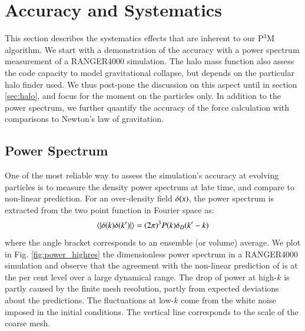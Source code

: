 \section{Accuracy and Systematics}
\label{sec:accuracy}
 
 This section describes the systematics effects that are inherent to our P$^{3}$M algorithm.
 We start with a demonstration of the accuracy with a power spectrum measurement of a RANGER4000 simulation. 
 The halo mass function also assess the code capacity to model gravitational collapse, 
 but depends on the particular halo finder used.
 We thus post-pone the discussion on this aspect until in section \ref{sec:halo},
and focus for the moment on the particles only. In addition to the power spectrum, we further quantify the accuracy of the force calculation
 with comparisons to Newton's law of gravitation.
 
 
 \subsection{Power Spectrum}
 \label{subsec:powerspectrum}
 
One of the most reliable way to assess the simulation's accuracy at evolving particles
is to measure the density power spectrum at late time, and compare to non-linear prediction. 
For an over-density field $\delta({\bf \it x})$, the power spectrum is extracted from the two point function in Fourier space as:
\begin{eqnarray}
\langle | \delta ({\bf \it k}) \delta ({\bf \it k'}) | \rangle = (2\pi)^{3}P(k)\delta_{D}({\bf \it k'} - {\bf \it k})
\label{eq:power}
\end{eqnarray}
where the angle bracket corresponds to an ensemble (or volume) average.
We plot in Fig. \ref{fig:power_highres} the dimensionless power spectrum in a RANGER4000 simulation and
observe that the agreement with the non-linear prediction of \cite{Lewis:1999bs} is at the per cent level over a large dynamical range.
The drop of power at high-$k$ is partly caused by the finite mesh resolution, partly from expected deviations about the predictions.
The fluctuations at low-$k$ come from the white noise imposed in the initial conditions. The vertical line corresponds to the scale of the coarse mesh.


